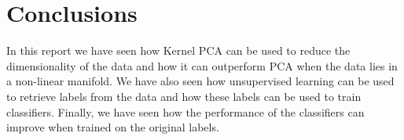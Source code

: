 \section{Conclusions}
In this report we have seen how Kernel PCA can be used to reduce the
dimensionality of the data and how it can outperform PCA when the data
lies in a non-linear manifold.
We have also seen how unsupervised learning can be used to retrieve
labels from the data and how these labels can be used to train classifiers.
Finally, we have seen how the performance of the classifiers can improve
when trained on the original labels.